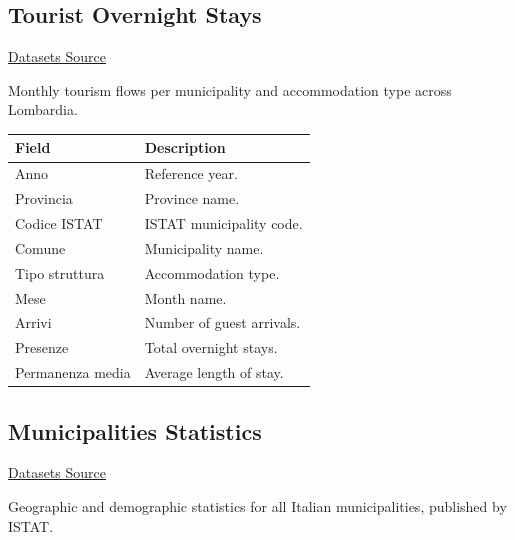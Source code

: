 \documentclass{article}
\begin{document}
	\subsection{Tourist Overnight Stays}
	
	\href{https://www.dati.lombardia.it/Turismo/Flussi-turistici-per-mese-nei-comuni-lombardi/mzxz-sz25/about_data}{Datasets Source}
	
	Monthly tourism flows per municipality and accommodation type across Lombardia.
	
	\begin{table}[H]
		\centering
		\begin{tabular}{ll}
			\hline
			Field & Description \\
			\hline
			Anno & Reference year. \\
			Provincia & Province name. \\
			Codice ISTAT & ISTAT municipality code. \\
			Comune & Municipality name. \\
			Tipo struttura & Accommodation type. \\
			Mese & Month name. \\
			Arrivi & Number of guest arrivals. \\
			Presenze & Total overnight stays. \\
			Permanenza media & Average length of stay. \\
			\hline
		\end{tabular}
	\end{table}
	
	\subsection{Municipalities Statistics}
	
	\href{https://www.istat.it/classificazione/principali-statistiche-geografiche-sui-comuni/}{Datasets Source}
	
	Geographic and demographic statistics for all Italian municipalities, published by ISTAT.
	
\end{document}

